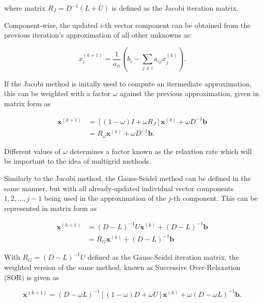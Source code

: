 where matrix $R_J = D^{-1}(L + U)$ is defined as the Jacobi iteration matrix.

Component-wise, the updated $i$-th vector component can be obtained from the previous iteration's approximation of all other unknowns as:

\begin{equation}
	x_{i}^{(k+1)} = \frac{1}{a_{ii}}\left(b_i- \sum_{j \neq i}{a_{ij}x_{j}^{(k)}} \right).
\end{equation}

If the Jacobi method is initally used to compute an itermediate approximation, this can be weighted with a factor $\omega$ against the previous approximation, given in matrix form as

\begin{equation}
	\begin{aligned}
	\mathbf{x}^{(k+1)} &= \left[ (1-\omega) I + \omega R_J \right] \mathbf{x}^{(k)} + \omega D^{-1}\mathbf{b} \\
	&= R_{\omega}\mathbf{x}^{(k)} + \omega D^{-1} \mathbf{b}.
	\end{aligned}
\end{equation}

Different values of $\omega$ determines a factor known as the relaxtion rate which will be important to the idea of multigrid methods.

Similarly to the Jacobi method, the Gauss-Seidel method can be defined in the same manner, but with all already-updated individual vector components $1, 2, \ldots, j - 1$  being used in the approximation of the $j$-th component. This can be represented in matrix form as

\begin{equation}
	\begin{aligned}
	\mathbf{x}^{(k+1)} &= (D-L)^{-1}U\mathbf{x}^{(k)} + (D-L)^{-1}\mathbf{b} \\
                       &= R_G\mathbf{x}^{(k)} + (D-L)^{-1}\mathbf{b}
	\end{aligned}
\end{equation}

With $R_G = (D-L)^{-1}U$ defined as the Gauss-Seidel iteration matrix, the weighted version of the same method, known as Successive Over-Relaxation (SOR) is given as

\begin{equation}
	\mathbf{x}^{(k+1)} = (D - \omega L)^{-1} \left[(1-\omega)D + \omega U \right]\mathbf{x}^{(k)} + \omega (D - \omega L)^{-1} \mathbf{b}.
\end{equation}

